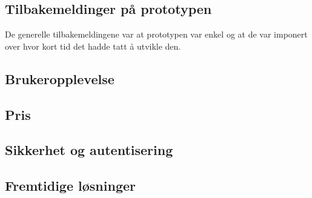 \subsection{Tilbakemeldinger på prototypen}
De generelle tilbakemeldingene var at prototypen var enkel og at de var imponert over hvor kort tid det hadde tatt å utvikle den.

\subsection{Brukeropplevelse}
\subsection{Pris}
\subsection{Sikkerhet og autentisering}
\subsection{Fremtidige løsninger}



\def\tightlist{}

